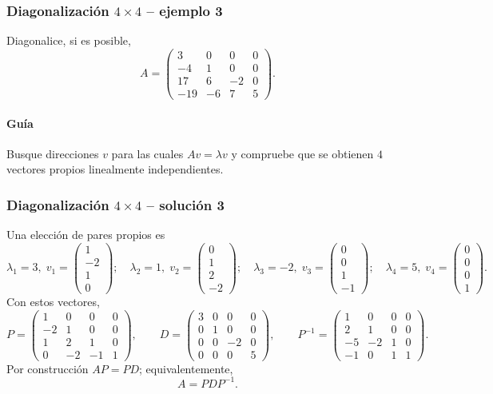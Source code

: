 \subsubsection*{Diagonalización $4\times 4$ -- ejemplo 3}

Diagonalice, si es posible,
\[
A=\begin{pmatrix}3 & 0 & 0 & 0\\-4 & 1 & 0 & 0\\17 & 6 & -2 & 0\\-19 & -6 & 7 & 5\end{pmatrix}.
\]

\paragraph{Guía}
Busque direcciones $v$ para las cuales $Av=\lambda v$ y compruebe que se obtienen $4$ vectores propios linealmente independientes.



\subsubsection*{Diagonalización $4\times 4$ -- solución 3}
\scriptsize
Una elección de pares propios es
\[
\lambda_1=3,\;v_1=\begin{pmatrix}1\\-2\\1\\0\end{pmatrix};\quad \lambda_2=1,\;v_2=\begin{pmatrix}0\\1\\2\\-2\end{pmatrix};\quad \lambda_3=-2,\;v_3=\begin{pmatrix}0\\0\\1\\-1\end{pmatrix};\quad \lambda_4=5,\;v_4=\begin{pmatrix}0\\0\\0\\1\end{pmatrix}.
\]
Con estos vectores,
\[
P=\begin{pmatrix}1 & 0 & 0 & 0\\-2 & 1 & 0 & 0\\1 & 2 & 1 & 0\\0 & -2 & -1 & 1\end{pmatrix},\qquad D=\begin{pmatrix}3 & 0 & 0 & 0\\0 & 1 & 0 & 0\\0 & 0 & -2 & 0\\0 & 0 & 0 & 5\end{pmatrix},\qquad P^{-1}=\begin{pmatrix}1 & 0 & 0 & 0\\2 & 1 & 0 & 0\\-5 & -2 & 1 & 0\\-1 & 0 & 1 & 1\end{pmatrix}.
\]
Por construcción $AP=PD$; equivalentemente,
\[
\boxed{A=PDP^{-1}}.
\]


